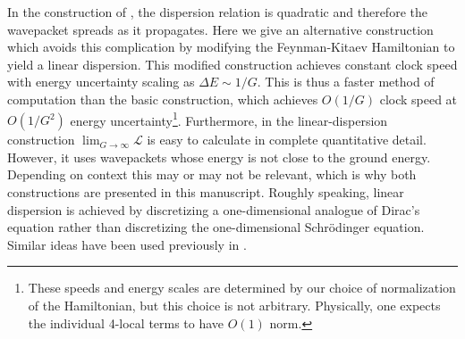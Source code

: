 \documentclass[11pt]{article}
\begin{document}
In the construction of , the dispersion relation is quadratic and therefore the wavepacket spreads as it propagates. Here we give an alternative construction which avoids this complication by modifying the Feynman-Kitaev Hamiltonian to yield a linear dispersion. This modified construction achieves constant clock speed with energy uncertainty scaling as $\Delta E \sim 1/G$. This is thus a faster method of computation than the basic construction, which achieves $O(1/G)$ clock speed at $O(1/G^2)$ energy uncertainty\footnote{These speeds and energy scales are determined by our choice of normalization of the Hamiltonian, but this choice is not arbitrary. Physically, one expects the individual 4-local terms to have $O(1)$ norm.}. Furthermore, in the linear-dispersion construction $\lim_{G \to \infty} \mathcal{L}$ is easy to calculate in complete quantitative detail. However, it uses wavepackets whose energy is not close to the ground energy. Depending on context this may or may not be relevant, which is why both constructions are presented in this manuscript. Roughly speaking, linear dispersion is achieved by discretizing a one-dimensional analogue of Dirac's equation rather than discretizing the one-dimensional Schr{\"o}dinger equation. Similar ideas have been used previously in \cite{B82, SB13}. 
\end{document}
